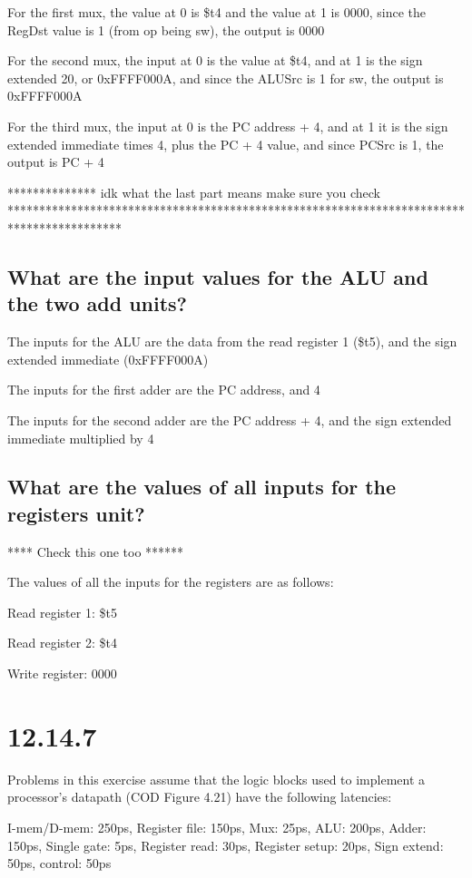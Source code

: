 \documentclass{article}
\begin{document}
For the first mux, the value at 0 is \$t4 and the value at 1 is 0000, since the RegDst value is 1 (from op being sw), the output is 0000

For the second mux, the input at 0 is the value at \$t4, and at 1 is the sign extended 20, or 0xFFFF000A, and since the ALUSrc is 1 for sw, the output is 0xFFFF000A

For the third mux, the input at 0 is the PC address + 4, and at 1 it is the sign extended immediate times 4, plus the PC + 4 value, and since PCSrc is 1, the output is PC + 4



************** idk what the last part means make sure you check ******************************************************************************************



\subsection{What are the input values for the ALU and the two add units?}

The inputs for the ALU are the data from the read register 1 (\$t5), and the sign extended immediate (0xFFFF000A)

The inputs for the first adder are the PC address, and 4

The inputs for the second adder are the PC address + 4, and the sign extended immediate multiplied by 4

\subsection{What are the values of all inputs for the registers unit?}

**** Check this one too ******

The values of all the inputs for the registers are as follows:

Read register 1: \$t5

Read register 2: \$t4

Write register: 0000


\section{12.14.7}
Problems in this exercise assume that the logic blocks used to implement a processor's datapath (COD Figure 4.21) have the following latencies:

I-mem/D-mem: 250ps, Register file: 150ps, Mux: 25ps, ALU: 200ps, Adder: 150ps, Single gate: 5ps, Register read: 30ps, Register setup: 20ps, Sign extend: 50ps, control: 50ps
\end{document}
